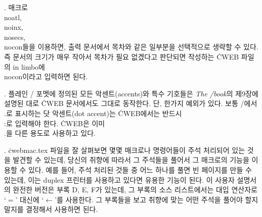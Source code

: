 {%
. 매크로 \.{\\noatl}, \.{\\noinx}, \.{\\nosecs}, \.{\\nocon}들을
이용하면, 출력 문서에서 목차와 같은 일부분을 선택적으로 생략할 수
있다. 즉 문서의 크기가 매우 작아서 목차가 필요 없겠다고 판단되면
작성하는 \.{CWEB} 파일의 in limbo에 \.{\\nocon}이라고 입력하면 된다.

. 플레인 \TEX/ 포멧에 정의된 모든 악센트(accents)와 특수
기호들은 {\sl The \TEX/book\/}의 제9장에 설명된 대로 \.{CWEB}
문서에서도 그대로 동작한다. 단, 한가지 예외가 있다.
보통 \TEX/에서 \.{\\.}로 표시하는 닷 악센트(dot
accent)는 \.{CWEB}에서는 반드시 \.{\\:}로 입력해야 한다. \.{CWEB}은
이미 \.{\\.}을 다른 용도로 사용하고 있다.

. \.{cwebmac.tex} 파일을 잘 살펴보면 몇몇 매크로나
명령어들이 주석 처리되어 있는 것을 발견할 수 있는데, 당신의 취향에
따라서 그 주석들을 풀어서 그 매크로의 기능을 이용할 수 있다. 예를 들어, 주석 처리된
것들 중 어느 하나를 풀면 빈 페이지를 만들 수 있는데, 이는 duplex
프린터를 사용하고 있다면 유용한 기능이 된다. 이 사용자 설명서의 완전한
버전은 부록 D, E, F가 있는데, 그 부록의 소스 리스트에서는 대입
연산자로 `$=$' 대신에 `$\gets$'를 사용한다. 그 부록들을 보고 취향에
맞는 어떤 주석을 풀어야 할지 말지를 결정해서 사용하면 된다.

}
